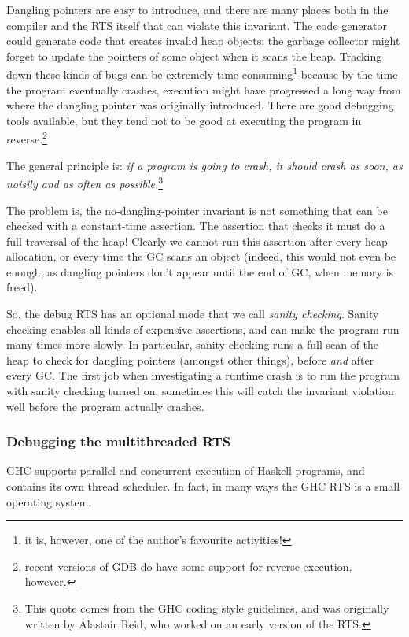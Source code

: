 \documentclass{article}
\begin{document}
Dangling pointers are easy to introduce, and there are many places
both in the compiler and the RTS itself that can violate this
invariant.  The code generator could generate code that creates invalid
heap objects; the garbage collector might forget to update the pointers
of some object when it scans the heap.  Tracking down these kinds of
bugs can be extremely time consuming\footnote{it is, however, one of
  the author's  favourite activities!} because by the time the program eventually
crashes, execution might have progressed a long way from where the
dangling pointer was originally introduced.  There are good debugging
tools available, but they tend not to be good at executing the program
in reverse.\footnote{recent versions of GDB do have some support for
  reverse execution, however.}

The general principle is: \emph{if a program is going to crash, it
  should crash as soon, as noisily and as often as
  possible.}\footnote{This quote comes from the GHC coding style
  guidelines, and was originally written by Alastair Reid, who worked
  on an early version of the RTS.}

The problem is, the no-dangling-pointer invariant is not something
that can be checked with a constant-time assertion.  The assertion
that checks it must do a full traversal of the heap!  Clearly we
cannot run this assertion after every heap allocation, or every time
the GC scans an object (indeed, this would not even be enough, as
dangling pointers don't appear until the end of GC, when memory is
freed).

So, the debug RTS has an optional mode that we call \emph{sanity
  checking}.  Sanity checking enables all kinds of expensive
assertions, and can make the program run many times more slowly.  In
particular, sanity checking runs a full scan of the heap to check for
dangling pointers (amongst other things), before \emph{and} after
every GC.  The first job when investigating a runtime crash is to run
the program with sanity checking turned on; sometimes this will catch
the invariant violation well before the program actually crashes.

\subsubsection{Debugging the multithreaded RTS}

GHC supports parallel and concurrent execution of Haskell programs,
and contains its own thread scheduler.  In fact, in many ways the GHC
RTS is a small operating system.
\end{document}
